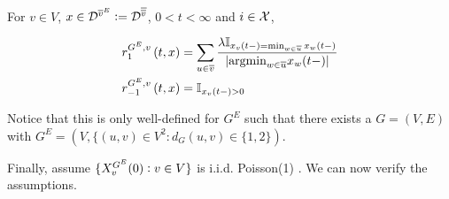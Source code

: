 \ind For \(v \in V\), \(x \in \mathcal{D}^{\overline{v}^E}:=\mathcal{D}^{\overline{\overline{v}}}\), \(0 < t < \infty\) and \(i \in \mathcal{X}\),

\begin{align*}
\rate\stpara{1}\gvpara{G^E}{v}\tmepro{t}{\xf}{} &= \sum_{u \in \cl{v}} \frac{\lambda\mb{I}_{\xf\vind{v}\tme{t-} = \min_{w\in\cl{u}} \xf\vind{w}\tme{t-}}}{|\te{argmin}_{w\in\cl{u}} \xf\vind{w}\tme{t-}|}\\
\rate\stpara{-1}\gvpara{G^E}{v}\tmepro{t}{\xf}{} &= \mb{I}_{\xf\vind{v}\tme{t-} > 0}
\end{align*}

Notice that this is only well-defined for \(G^E\) such that there exists a \(G = (V,E)\) with \(G^E = (V,\{(u,v)\in V^2:d_G(u,v) \in \{1,2\})\).

\ind Finally, assume \(\{X_{v}^{G^E}(0): v \in V\}\) is i.i.d. Poisson(1) . We can now verify the assumptions.

